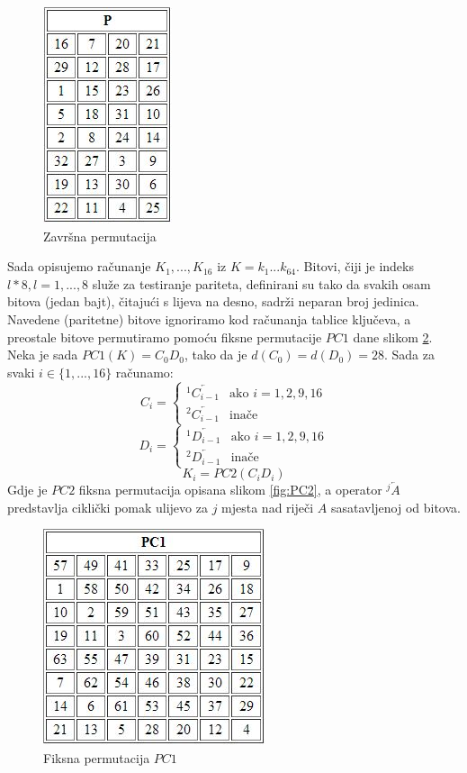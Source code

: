 \documentclass[a4paper,oneside,12pt]{memoir} %
\begin{document}
\begin{spacing}{1.5}
\begin{figure}[h]
\centering \includegraphics[scale=1]{P.jpg}
\caption{Završna permutacija}
\label{fig:permP}
\end{figure}

Sada opisujemo računanje $K_1,...,K_{16}$ iz $K=k_1...k_{64}$. Bitovi, čiji je indeks $l*8, l=1,...,8$ služe za testiranje pariteta, definirani su tako da svakih osam bitova (jedan bajt), čitajući s lijeva na desno, sadrži neparan broj jedinica. Navedene (paritetne) bitove ignoriramo kod računanja tablice ključeva, a preostale bitove permutiramo  pomoću fiksne permutacije $PC1$ dane slikom \ref{fig:PC1}. Neka je sada $PC1(K)=C_0D_0$, tako da je $d(C_0)=d(D_0)=28$. Sada za svaki $i \in \{1,...,16\}$ računamo:
\[C_i=\begin{cases}^1\overleftarrow{C_{i-1}} &\mbox{ako } i=1,2,9,16 \\  ^2\overleftarrow{C_{i-1}} &\mbox{inače } \end{cases}\]
\[D_i=\begin{cases}^1\overleftarrow{D_{i-1}} &\mbox{ako } i=1,2,9,16 \\  ^2\overleftarrow{D_{i-1}} &\mbox{inače } \end{cases}\]
\[K_i=PC2(C_iD_i)\]
Gdje je $PC2$ fiksna permutacija opisana slikom \ref{fig:PC2}, a operator $^j\overleftarrow{A}$ predstavlja ciklički pomak ulijevo za  $j$ mjesta nad riječi $A$ sasatavljenoj od bitova.
\begin{figure}[h]
\centering \includegraphics[scale=1]{PC1.jpg}
\caption{Fiksna permutacija $PC1$}
\label{fig:PC1}
\end{figure}


\end{spacing}
\end{document}
